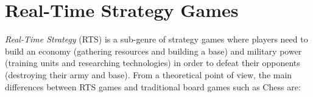 \documentclass{llncs}
\begin{document}


\section{Real-Time Strategy Games}\label{sec:rts}

{\em Real-Time Strategy} (RTS) is a sub-genre of strategy games where players need
to  build an  economy (gathering  resources and  building a  base) and
military power (training units  and researching technologies) in order
to defeat  their opponents  (destroying their army  and base).  From a
theoretical point of view, the  main differences between RTS games and
traditional board games such as Chess are:
\end{document}
